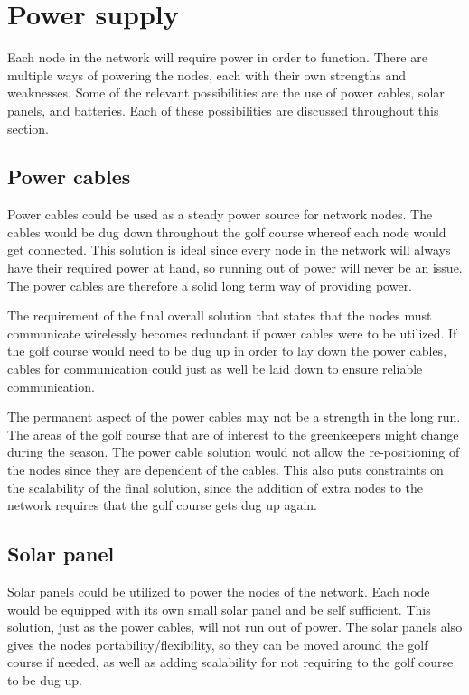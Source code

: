 \section{Power supply}

Each node in the network will require power in order to function. There are multiple ways of powering the nodes, each with their own strengths and weaknesses. Some of the relevant possibilities are the use of power cables, solar panels, and batteries. Each of these possibilities are discussed throughout this section.


\subsection*{Power cables}
Power cables could be used as a steady power source for network nodes. The cables would be dug down throughout the golf course whereof each node would get connected. This solution is ideal since every node in the network will always have their required power at hand, so running out of power will never be an issue. The power cables are therefore a solid long term way of providing power.

The requirement of the final overall solution that states that the nodes must communicate wirelessly becomes redundant if power cables were to be utilized. If the golf course would need to be dug up in order to lay down the power cables, cables for communication could just as well be laid down to ensure reliable communication.

The permanent aspect of the power cables may not be a strength in the long run. The areas of the golf course that are of interest to the greenkeepers might change during the season. The power cable solution would not allow the re-positioning of the nodes since they are dependent of the cables. This also puts constraints on the scalability of the final solution, since the addition of extra nodes to the network requires that the golf course gets dug up again.

\subsection*{Solar panel}
Solar panels could be utilized to power the nodes of the network. Each node would be equipped with its own small solar panel and be self sufficient. This solution, just as the power cables, will not run out of power. The solar panels also gives the nodes portability/flexibility, so they can be moved around the golf course if needed, as well as adding scalability for not requiring to the golf course to be dug up.

